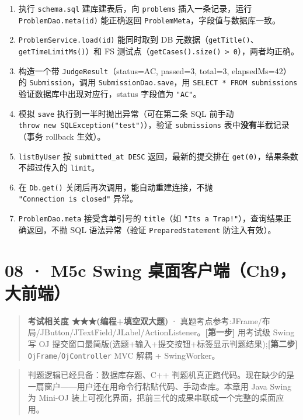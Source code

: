 \documentclass[
  11pt,
]{ctexart}
\providecommand{\tightlist}{%
  \setlength{\itemsep}{0pt}\setlength{\parskip}{0pt}}
\begin{document}
\begin{enumerate}
\def\labelenumi{\arabic{enumi}.}
\tightlist
\item
  执行 \texttt{schema.sql} 建库建表后，向 \texttt{problems}
  插入一条记录，运行 \texttt{ProblemDao.meta(id)} 能正确返回
  \texttt{ProblemMeta}，字段值与数据库一致。
\item
  \texttt{ProblemService.load(id)} 能同时取到 DB
  元数据（\texttt{getTitle()}、\texttt{getTimeLimitMs()}）和 FS
  测试点（\texttt{getCases().size()\ \textgreater{}\ 0}），两者均正确。
\item
  构造一个带 \texttt{JudgeResult}（status=AC, passed=3, total=3,
  elapsedMs=42）的 \texttt{Submission}，调用
  \texttt{SubmissionDao.save}，用 \texttt{SELECT\ *\ FROM\ submissions}
  验证数据库中出现对应行，status 字段值为 \texttt{"AC"}。
\item
  模拟 \texttt{save} 执行到一半时抛出异常（可在第二条 SQL 前手动
  \texttt{throw\ new\ SQLException("test")}），验证 \texttt{submissions}
  表中\textbf{没有}半截记录（事务 rollback 生效）。
\item
  \texttt{listByUser} 按 \texttt{submitted\_at\ DESC}
  返回，最新的提交排在 \texttt{get(0)}，结果条数不超过传入的
  \texttt{limit}。
\item
  在 \texttt{Db.get()} 关闭后再次调用，能自动重建连接，不抛
  \texttt{"Connection\ is\ closed"} 异常。
\item
  \texttt{ProblemDao.meta} 接受含单引号的 \texttt{title}（如
  \texttt{"It\textquotesingle{}s\ a\ Trap!"}），查询结果正确返回，不抛
  SQL 语法异常（验证 \texttt{PreparedStatement} 防注入有效）。
\end{enumerate}

\hypertarget{m5c-swing-ux684cux9762ux5ba2ux6237ux7aefch9ux5927ux524dux7aef}{%
\section{08 · M5c Swing
桌面客户端（Ch9，大前端）}\label{m5c-swing-ux684cux9762ux5ba2ux6237ux7aefch9ux5927ux524dux7aef}}

\begin{quote}
\textbf{考试相关度 ★★★(编程+填空双大题)} ·
真题考点参考:JFrame/布局/JButton/JTextField/JLabel/ActionListener。\textbf{{[}第一步{]}}
\KS 用考试级 Swing 写 OJ
提交窗口最简版(选题+输入+提交按钮+标签显示判题结果);\textbf{{[}第二步{]}}
\GC \texttt{OjFrame}/\texttt{OjController} MVC 解耦 + SwingWorker。
\end{quote}

\begin{quote}
判题逻辑已经具备：数据库存题、C++
判题机真正跑代码。现在缺少的是一扇窗户------用户还在用命令行粘贴代码、手动查库。本章用
Java Swing 为 Mini-OJ
装上可视化界面，把前三代的成果串联成一个完整的桌面应用。
\end{quote}
\end{document}
